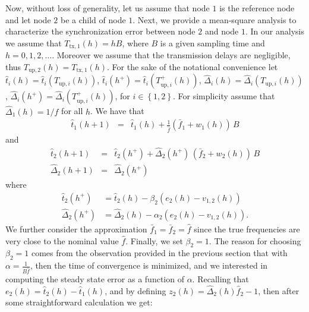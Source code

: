 \documentclass[english,a4paper,10pt,final]{article}
\numberwithin{equation}{section}
\numberwithin{figure}{section}
\begin{document}
Now, without loss of generality, let us assume that node $1$ is the reference node and let node $2$ be a child of node $1$. Next, we provide a mean-square analysis to characterize the synchronization error between node $2$ and node $1$. 
In our analysis we assume that $T_{\mathrm{tx},1}(h)=hB$, where $B$ is a given sampling time and $h=0,1,2,\ldots$. Moreover we assume that the transmission delays are negligible, thus $T_{\mathrm{up},2}(h)=T_{\mathrm{tx},1}(h)$. For the sake of the notational convenience let $\hat{t}_i(h)=\hat{t}_i(T_{\mathrm{up},i}(h))$, $\hat{t}_i(h^+)=\hat{t}_i(T_{\mathrm{up},i}^+(h))$, $\hat{\Delta}_i(h)= \hat{\Delta}_i(T_{\mathrm{up},i}(h))$, $\hat{\Delta}_i(h^+)= \hat{\Delta}_i(T_{\mathrm{up},i}^+(h))$, for $i \in \left\{1,2\right\}$. For simplicity assume that $\hat{\Delta}_1(h)=1/\hat{f}$ for all $h$. We have that
\begin{eqnarray*}
    \hat{t}_1(h+1) & = & \hat{t}_1(h) +\frac{1}{\hat{f}}(\bar{f}_1+w_1(h))\,B
\end{eqnarray*}
and 
\begin{eqnarray*}
    \hat{t}_2(h+1) & = & \hat{t}_2(h^+) + \hat{\Delta}_2(h^+)\,(\bar{f}_2+w_2(h))\,B\nonumber\\
  \hat{\Delta}_2(h+1) & = & \hat{\Delta}_2(h^+)
\end{eqnarray*}
where
\begin{align}
\hat{t}_2(h^+) &=\hat{t}_2(h) - \beta_2 (e_2(h)-v_{1,2}(h))\\
\hat{\Delta}_2(h^+)& = \hat{\Delta}_2(h)- \alpha_2 (e_2(h)-v_{1,2}(h)).
\end{align}
We further consider the approximation $\bar{f}_1=\bar{f}_2=\hat f$ since the true frequencies are very close to the nominal value $\hat f$. Finally, we set $\beta_2=1$. The reason for choosing $\beta_2=1$ comes from the observation provided in the previous section that with $\alpha=\frac{1}{B\hat f}$, then the time of convergence is minimized, and we interested in computing the steady state error as a function of $\alpha$.
Recalling that $e_2(h)=\hat{t}_2(h)-\hat{t}_1(h)$, and by defining $z_2(h)=\hat{\Delta}_2(h)\hat f_2-1$, then after some straightforward calculation we get: 
\end{document}
